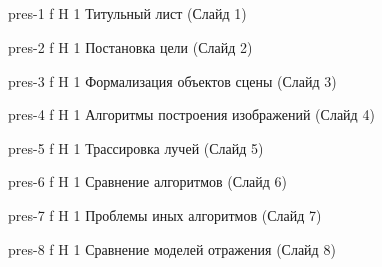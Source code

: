 \begin{appendices}
	\chapter{}
	{pres-1} %
	{f} %
	{H} %
	{1\textwidth} %
	{Титульный лист (Слайд 1)} %
	
	{pres-2} %
	{f} %
	{H} %
	{1\textwidth} %
	{Постановка цели (Слайд 2)} %
	
	{pres-3} %
	{f} %
	{H} %
	{1\textwidth} %
	{Формализация объектов сцены (Слайд 3)} %
	
	{pres-4} %
	{f} %
	{H} %
	{1\textwidth} %
	{Алгоритмы построения изображений (Слайд 4)} %
	
	{pres-5} %
	{f} %
	{H} %
	{1\textwidth} %
	{Трассировка лучей (Слайд 5)} %
	
	{pres-6} %
	{f} %
	{H} %
	{1\textwidth} %
	{Сравнение алгоритмов (Слайд 6)} %
	
	{pres-7} %
	{f} %
	{H} %
	{1\textwidth} %
	{Проблемы иных алгоритмов (Слайд 7)} %
	
	{pres-8} %
	{f} %
	{H} %
	{1\textwidth} %
	{Сравнение моделей отражения (Слайд 8)} %
	

\end{appendices}
